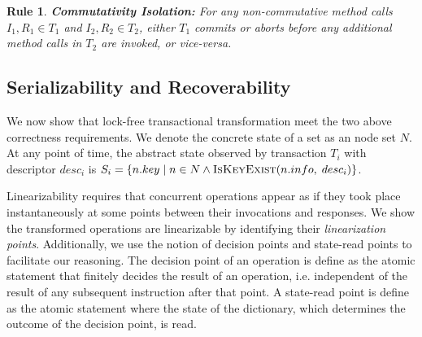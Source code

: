 \documentclass[]{sig-alternate-05-2015}
\newtheorem{crule}{Rule}
\begin{document}
\begin{crule}
    \textbf{Commutativity Isolation:} For any non-commutative method calls $I_1,R_1 \in T_1$ and $I_2,R_2 \in T_2$, either $T_1$ commits or aborts before any additional method calls in $T_2$ are invoked, or vice-versa.
\end{crule}


\subsection{Serializability and Recoverability}
We now show that lock-free transactional transformation meet the two above correctness requirements. 
We denote the concrete state of a set as an node set $N$.
At any point of time, the abstract state observed by transaction $T_i$ with descriptor $desc_i$ is $S_i = \{n.key\;|\;n \in N \land \textsc{IsKeyExist}(n.info,\;desc_i)\}$.

Linearizability requires that concurrent operations appear as if they took place instantaneously at some points between their invocations and responses.
We show the transformed operations are linearizable by identifying their \emph{linearization points}.
Additionally, we use the notion of decision points and state-read points to facilitate our reasoning. 
The decision point of an operation is define as the atomic statement that finitely decides the result of an operation, i.e. independent of the result of any subsequent instruction after that point.
A state-read point is define as the atomic statement where the state of the dictionary, which determines the outcome of the decision point, is read.
\end{document}
